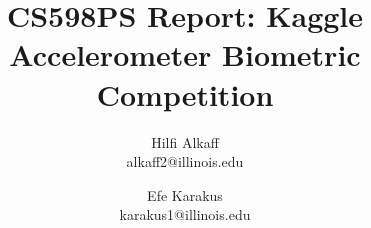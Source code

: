 \documentclass[letterpaper,twocolumn,10pt]{article}
\begin{document}
\date{}

\title{\Large \bf CS598PS Report: Kaggle Accelerometer Biometric Competition}

\author{
{\rm Hilfi Alkaff}\\
alkaff2@illinois.edu
\and
{\rm Efe Karakus}\\
karakus1@illinois.edu
\and
} %

\maketitle

\thispagestyle{empty}








\end{document}
